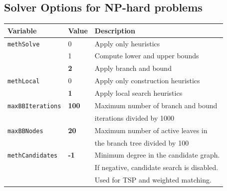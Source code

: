 \documentclass[a4paper,11pt,twoside]{book}
\begin{document}
\begin{multicols}{2}
\subsection{Solver Options for NP-hard problems}
\label{slb_options_hard}
\begin{center}
\begin{tabular}{|p{3cm}|p{1cm}|p{8cm}|}
\hline
{\bf Variable} & {\bf Value} & {\bf Description} \\
\hline
\hline
\verb/methSolve/    & 0 & Apply only heuristics \\
                    & 1 & Compute lower and upper bounds \\
                    & {\bf 2} & Apply branch and bound \\
\hline
\verb/methLocal/    & 0 & Apply only construction heuristics \\
                    & {\bf 1} & Apply local search heuristics \\
\hline
\verb/maxBBIterations/ & {\bf 100} & Maximum number of branch and bound \\
                    & & iterations divided by 1000 \\
\hline
\verb/maxBBNodes/   & {\bf 20} & Maximum number of active leaves in \\
                    & & the branch tree divided by 100 \\
\hline
\verb/methCandidates/& {\bf -1} & Minimum degree in the candidate graph. \\
                    & & If negative, candidate search is disabled. \\
                    & & Used for TSP and weighted matching. \\
\hline
\end{tabular}
\end{center}


\newpage

\end{multicols}
\end{document}
